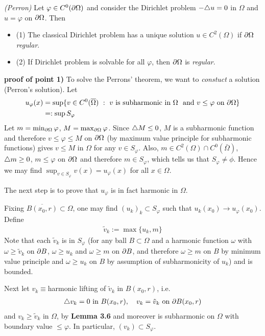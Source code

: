 \documentclass[12pt,a4paper]{article}
\newenvironment{proof}
{\begin{changemargin}{1cm}{0.5cm} 
	}%
	{\end{changemargin}
}
\renewenvironment{i}
{\begin{itemize} 
	}%
	{\end{itemize}
}
\begin{document}
\thm \emph{(Perron)} Let $\varphi \in C^0 (\partial \Omega)$ and consider the Dirichlet problem $-\triangle u =0$ in $\Omega$ and $u=\varphi$ on $\partial \Omega$. Then
\begin{i}
\item[(1)] The classical Dirichlet problem has a unique solution $u\in C^2(\Omega)$ if $\partial \Omega$ \emph{regular}.
\item[(2)] If Dirichlet problem is solvable for all $\varphi$, then $\partial \Omega$ is \emph{regular}.
\end{i}
\begin{proof}
\textbf{proof of point 1)} To solve the Perrons' theorem, we want to \emph{constuct} a solution (Perron's solution). Let
\begin{align*}
u_{\varphi}(x) &= \sup \{ v\in C^0(\overline{\Omega})\,\, :\,\, v \text{ is subharmonic in } \Omega\,\, \text{ and} \,\,v\leq \varphi \text{ on }\partial \Omega \} \\
&=: \sup S_{\varphi}
\end{align*}
Let $m = \min_{\partial \Omega} \varphi$, $M = \max_{\partial \Omega} \varphi$. Since $\triangle M \leq 0$, $M$ is a subharmonic function and therefore $v\leq \varphi \leq M$ on $\partial \Omega$ (by maximum value principle for subharmonic functions) gives $v\leq M$ in $\Omega$ for any $v\in S_{\varphi}$. Also, $m\in C^2(\Omega) \cap C^0(\bar{\Omega})$, $\triangle m \geq 0$, $m\leq \varphi$ on $\partial \Omega$ and therefore $m\in S_{\varphi}$, which tells us that $S_{\varphi} \neq \phi$. Hence we may find $\sup_{v\in S_{\varphi}} v(x) = u_{\varphi}(x)$ for all $x\in \Omega$.
\s

The next step is to prove that $u_{\varphi}$ is in fact harmonic in $\Omega$.
\s

Fixing $\overline{B(x_0, r)} \subset \Omega$, one may find $(u_k)_k \subset S_{\varphi}$ such that $u_k(x_0) \rightarrow u_{\varphi}(x_0)$. Define
\begin{align*}
\tilde{v}_k := \max \{u_k, m\}
\end{align*}
Note that each $\tilde{v}_k$ is in $S_{\varphi}$ (for any ball $B\subset \Omega$ and a harmonic function $\omega$ with $\omega \geq \tilde{v}_k$ on $\partial B$, $\omega \geq u_k$ and $\omega \geq m$ on $\partial B$, and therefore $\omega \geq m$ on $B$ by minimum value principle and $\omega \geq u_k$ on $B$ by assumption of subharmonicity of $u_k$) and is bounded.

\quad Next let $v_k \equiv$harmonic lifting of $\tilde{v}_k$ in $B(x_0, r)$, i.e. 
\begin{align*}
\triangle v_k =0 \text{ in }B(x_0,r), \quad v_k = \tilde{v}_k \text{ on } \partial B(x_0,r)
\end{align*}
and $v_k \geq \tilde{v}_k$ in $\Omega$, by \textbf{Lemma 3.6} and moreover is subharmonic on $\Omega$ with boundary value $\leq \varphi$. In particular, $(v_k) \subset S_{\varphi}$.
\s


\end{proof}
\end{document}

